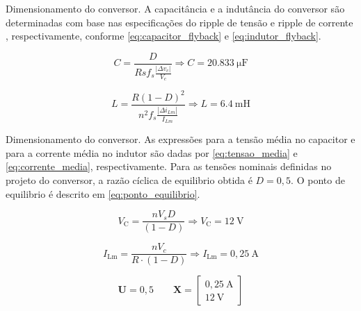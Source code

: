 \documentclass[xcolor=dvipsnames,aspectratio=169]{beamer}
\begin{document}
\begin{frame}{Dimensionamento do conversor.}
    \justifying
    A capacitância e a indutância do conversor são determinadas com base nas especificações do ripple de tensão e ripple de corrente \cite{Erickson2020}, respectivamente, conforme \eqref{eq:capacitor_flyback} e \eqref{eq:indutor_flyback}.

    \begin{equation}
        C = \frac{D}{Rs f_s \frac{|\Delta v_c|}{V_c}} \Rightarrow C = 20.833\ \mathrm{\mu F}
        \label{eq:capacitor_flyback}
    \end{equation}

    \begin{equation}
        L  =\frac{R(1-D)^2}{n^2 f_s \frac{|\Delta i_{Lm}|}{I_{Lm}}} \Rightarrow L = 6.4\ \mathrm{mH}
        \label{eq:indutor_flyback}
    \end{equation}

\end{frame}

\begin{frame}{Dimensionamento do conversor.}
\justifying
As expressões para a tensão média no capacitor e para a corrente média no indutor são dadas por \eqref{eq:tensao_media} e \eqref{eq:corrente_media}, respectivamente.
Para as tensões nominais definidas no projeto do conversor, a razão cíclica de equilibrio obtida é \(D = 0,5\). O ponto de equilibrio é descrito em \eqref{eq:ponto_equilibrio}.

    \begin{equation}
        V_\mathrm{C} = \frac{n V_s D}{(1 - D)} \Rightarrow V_\mathrm{C} = 12 \ \mathrm{V}
        \label{eq:tensao_media}
    \end{equation}

    \begin{equation}
        I_\mathrm{Lm} = \frac{n V_c}{R \cdot (1-D)} \Rightarrow  I_\mathrm{Lm} = 0,25 \ \mathrm{A}
        \label{eq:corrente_media}
    \end{equation}

        \begin{equation}
        \mathbf{U} = 0,5 \qquad \mathbf{X} =
        \begin{bmatrix}
            0,25\ \mathrm{A} \\
            12 \ \mathrm{V}
        \end{bmatrix}
        \label{eq:ponto_equilibrio}
    \end{equation}


\end{frame}
\end{document}
